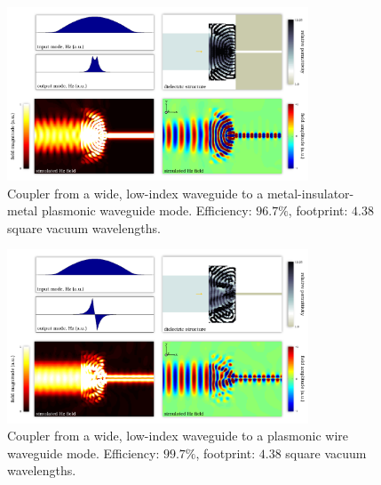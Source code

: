 \begin{figure}[h!]
    \centering
    \includegraphics[width=0.8\textwidth]{p3/14}
    \caption{
        Coupler from a wide, low-index waveguide to a
            metal-insulator-metal plasmonic waveguide mode.
        Efficiency: $96.7\%$,
        footprint: $4.38$ square vacuum wavelengths.
        }
\end{figure}
\begin{figure}[h!]
    \centering
    \includegraphics[width=0.8\textwidth]{p3/15}
    \caption{
        Coupler from a wide, low-index waveguide to a
            plasmonic wire waveguide mode.
        Efficiency: $99.7\%$,
        footprint: $4.38$ square vacuum wavelengths.
        }
\end{figure}
\clearpage

